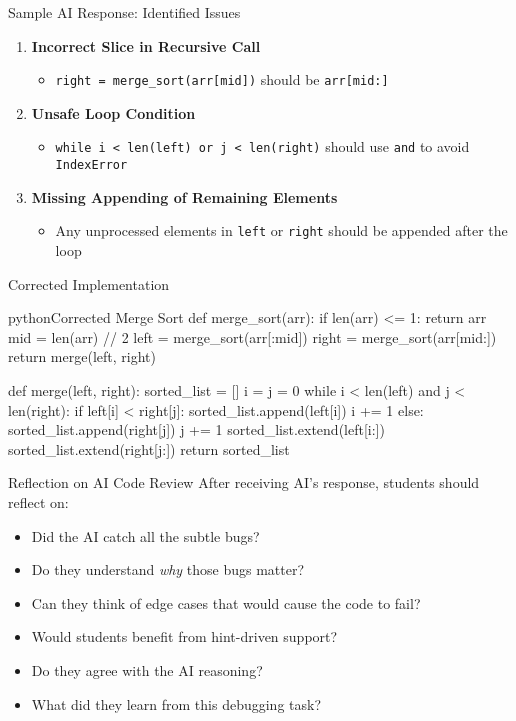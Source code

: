 \documentclass[xcolor={dvipsnames}, aspectratio=169]{beamer}
\begin{document}
\begin{frame}{Sample AI Response: Identified Issues}
  \begin{enumerate}
    \item \textbf{Incorrect Slice in Recursive Call}
      \begin{itemize}
        \item \texttt{right = merge\_sort(arr[mid])} should be \texttt{arr[mid:]}
      \end{itemize}
    
    \item \textbf{Unsafe Loop Condition}
      \begin{itemize}
        \item \texttt{while i < len(left) or j < len(right)} should use \texttt{and} to avoid \texttt{IndexError}
      \end{itemize}
    
    \item \textbf{Missing Appending of Remaining Elements}
      \begin{itemize}
        \item Any unprocessed elements in \texttt{left} or \texttt{right} should be appended after the loop
      \end{itemize}
  \end{enumerate}
\end{frame}

\begin{frame}[fragile]{Corrected Implementation}
  \begin{codeboxtc}{python}{Corrected Merge Sort}{}{}
def merge_sort(arr):
    if len(arr) <= 1:
        return arr
    mid = len(arr) // 2
    left = merge_sort(arr[:mid])
    right = merge_sort(arr[mid:])
    return merge(left, right)

def merge(left, right):
    sorted_list = []
    i = j = 0
    while i < len(left) and j < len(right):
        if left[i] < right[j]:
            sorted_list.append(left[i])
            i += 1
        else:
            sorted_list.append(right[j])
            j += 1
    sorted_list.extend(left[i:])
    sorted_list.extend(right[j:])
    return sorted_list
  \end{codeboxtc}
\end{frame}

\begin{frame}{Reflection on AI Code Review}
  After receiving AI's response, students should reflect on:
  \begin{itemize}
    \item Did the AI catch all the subtle bugs?
    \item Do they understand \textit{why} those bugs matter?
    \item Can they think of edge cases that would cause the code to fail?
    \item Would students benefit from hint-driven support?
    \item Do they agree with the AI reasoning?
    \item What did they learn from this debugging task?
  \end{itemize}
\end{frame}
\end{document}

